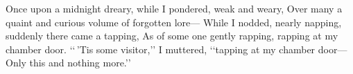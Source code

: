 \documentclass[answers]{exam}
\begin{document}
\begin{questions}
  \begin{solutionbox}{2in}
    Once upon a midnight dreary, while I pondered, weak and weary, Over
    many a quaint and curious volume of forgotten lore--- While I
    nodded, nearly napping, suddenly there came a tapping, As of some
    one gently rapping, rapping at my chamber door. ‘‘\,’Tis some
    visitor,’’ I muttered, ‘‘tapping at my chamber door--- Only this and
    nothing more.’’
    \end{solutionbox}
\end{questions}
\end{document}
